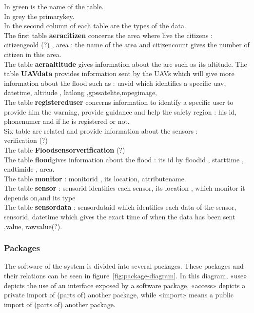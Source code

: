 In green is the name of the table. \\
In grey the primarykey. \\
In the second column of each table are the types of the data. \\

The first table \textbf{aeracitizen} concerns the area where live the citizens : citizengeold (?) , area : the name of the area and citizencount gives the number of citizen in this area.\\
 The table \textbf{aeraaltitude} gives information about the are such as its altitude.
The table \textbf{UAVdata} provides information sent by the UAVs which will give more information about the flood such as : uavid which identifies a specific uav, datetime, altitude , latlong ,gpssatelite,mpegimage, \\
The table \textbf{registereduser} concerns information to identify a specific user to provide him the warning, provide guidance and help the safety region : his id, phonenumer and if he is registered or not. \\

Six table are related and provide information about the sensors : \\
verification (?) \\
The table \textbf{Floodsensorverification} (?) \\
The table \textbf{flood}gives information about the flood : its id by floodid , starttime , endtimide , area. \\
The table \textbf{monitor} : monitorid , its location, attributename. \\
The table \textbf{sensor} : sensorid identifies each sensor, its location , which monitor it depends on,and its type \\
The table \textbf{sensordata} : sensordataid which identifies each data of the sensor, sensorid, datetime which gives the exact time of when the data has been sent ,value,  rawvalue(?). 

\subsubsection{Packages}
The software of the system is divided into several packages. These packages and their relations can be seen in figure~\ref{fig:package-diagram}. 
In this diagram, «use» depicts the use of an interface exposed by a software package, «access» depicts a private import of (parts of) another package, while «import» means a public import of (parts of) another package. 

